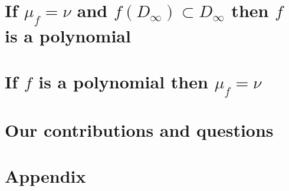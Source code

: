 \documentclass[12pt,letterpaper,twoside]{book}
\theoremstyle{definition}
\begin{document}
\chapter{If $\mu_f=\nu$ and $f(D_\infty)\subset D_\infty$ then $f$ is a polynomial  }\label{chapter2}



\chapter{If $f$ is a polynomial then $\mu_f=\nu$}\label{chapter3}




\chapter{Our contributions and questions}\label{chapter 4}


\appendix
\chapter{Appendix}\label{chapterappendix}





\end{document}
